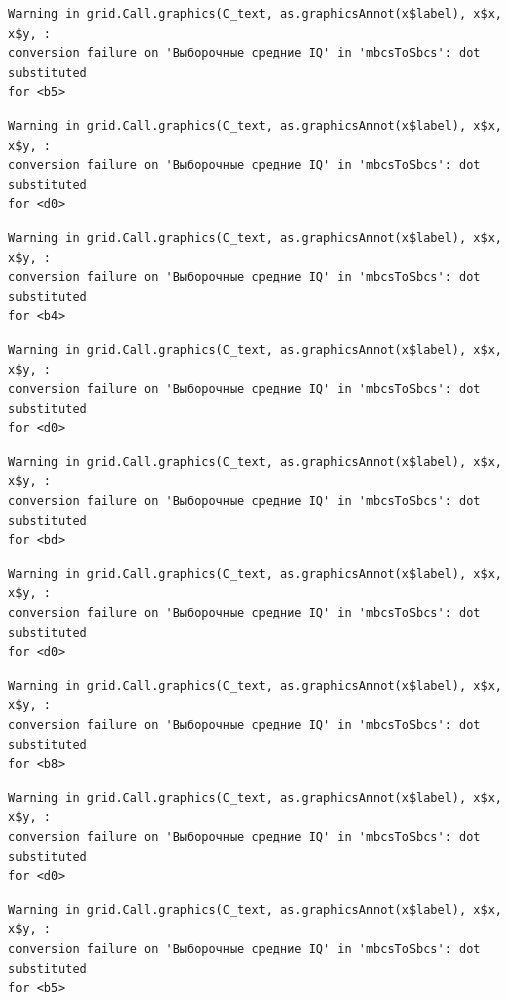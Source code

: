 \documentclass[
  letterpaper,
  DIV=11,
  numbers=noendperiod]{scrreprt}
\theoremstyle{definition}
\theoremstyle{remark}
\begin{document}
\begin{verbatim}
Warning in grid.Call.graphics(C_text, as.graphicsAnnot(x$label), x$x, x$y, :
conversion failure on 'Выборочные средние IQ' in 'mbcsToSbcs': dot substituted
for <b5>
\end{verbatim}

\begin{verbatim}
Warning in grid.Call.graphics(C_text, as.graphicsAnnot(x$label), x$x, x$y, :
conversion failure on 'Выборочные средние IQ' in 'mbcsToSbcs': dot substituted
for <d0>
\end{verbatim}

\begin{verbatim}
Warning in grid.Call.graphics(C_text, as.graphicsAnnot(x$label), x$x, x$y, :
conversion failure on 'Выборочные средние IQ' in 'mbcsToSbcs': dot substituted
for <b4>
\end{verbatim}

\begin{verbatim}
Warning in grid.Call.graphics(C_text, as.graphicsAnnot(x$label), x$x, x$y, :
conversion failure on 'Выборочные средние IQ' in 'mbcsToSbcs': dot substituted
for <d0>
\end{verbatim}

\begin{verbatim}
Warning in grid.Call.graphics(C_text, as.graphicsAnnot(x$label), x$x, x$y, :
conversion failure on 'Выборочные средние IQ' in 'mbcsToSbcs': dot substituted
for <bd>
\end{verbatim}

\begin{verbatim}
Warning in grid.Call.graphics(C_text, as.graphicsAnnot(x$label), x$x, x$y, :
conversion failure on 'Выборочные средние IQ' in 'mbcsToSbcs': dot substituted
for <d0>
\end{verbatim}

\begin{verbatim}
Warning in grid.Call.graphics(C_text, as.graphicsAnnot(x$label), x$x, x$y, :
conversion failure on 'Выборочные средние IQ' in 'mbcsToSbcs': dot substituted
for <b8>
\end{verbatim}

\begin{verbatim}
Warning in grid.Call.graphics(C_text, as.graphicsAnnot(x$label), x$x, x$y, :
conversion failure on 'Выборочные средние IQ' in 'mbcsToSbcs': dot substituted
for <d0>
\end{verbatim}

\begin{verbatim}
Warning in grid.Call.graphics(C_text, as.graphicsAnnot(x$label), x$x, x$y, :
conversion failure on 'Выборочные средние IQ' in 'mbcsToSbcs': dot substituted
for <b5>
\end{verbatim}
\end{document}
